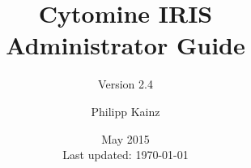 \documentclass[
a4paper,
11pt,
oneside,
headsepline
]{scrbook}
\def\appVersion{2.4}
\begin{document}
\begin{titlepage}

\end{titlepage}

\frontmatter

\subject{Interobserver Reliability Study Module}
\title{Cytomine IRIS\\Administrator Guide}
\subtitle{Version \appVersion}
\author{Philipp Kainz}
\date{May 2015\\{\small Last updated: \today}}
\maketitle


\newpage
{
\hypersetup{linkcolor=black}
\noptcrule
\doparttoc[n] 
\tableofcontents
}
\mainmatter





\end{document}
